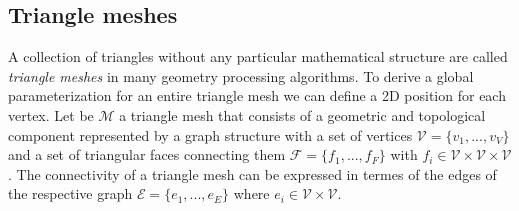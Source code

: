 
\subsection{Triangle meshes}
A collection of triangles without any particular mathematical structure are called \textit{triangle meshes} in many geometry processing algorithms. To derive a global parameterization for an entire triangle mesh we can define a 2D position for each vertex. Let be $\mathcal{M}$ a triangle mesh that consists of a geometric and topological component represented by a graph structure with a set of vertices $\mathcal{V} = \{ v_1, ..., v_V \}$ and a set of triangular faces connecting them $\mathcal{F} = \{ f_1, ... , f_F \}$ with $f_i \in \mathcal{V} \times \mathcal{V} \times \mathcal{V}$. The connectivity of a triangle mesh can be expressed in termes of the edges of the respective graph $\mathcal{E} = \{ e_1, ..., e_E \}$ where $e_i \in \mathcal{V} \times \mathcal{V}$.
